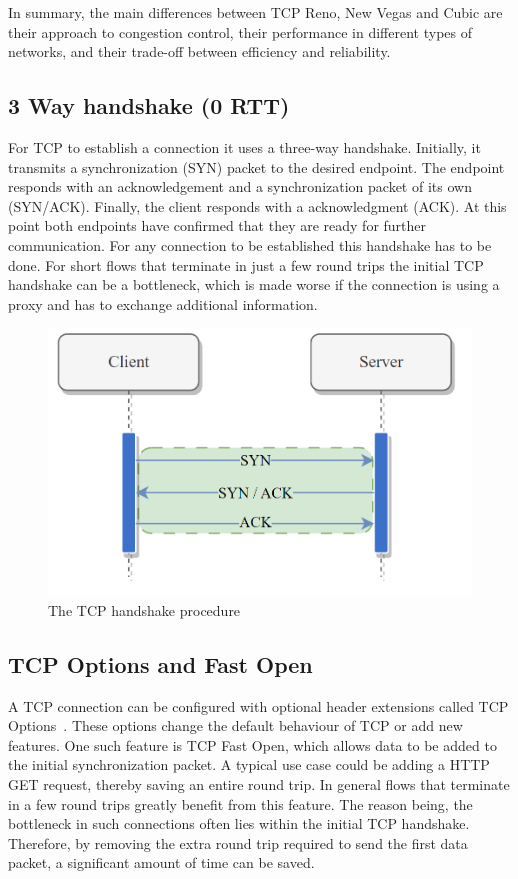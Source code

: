 \documentclass[a4paper,english, 11pt]{report}
\begin{document}
In summary, the main differences between TCP Reno, New Vegas and Cubic are their approach to congestion control, their performance in different types of networks, and their trade-off between efficiency and reliability.

\subsection{3 Way handshake (0 RTT)}
For TCP to establish a connection it uses a three-way handshake. Initially, it transmits a synchronization (SYN) packet to the desired endpoint. The endpoint responds with an acknowledgement and a synchronization packet of its own (SYN/ACK). Finally, the client responds with a acknowledgment (ACK). At this point both endpoints have confirmed that they are ready for further communication. For any connection to be established this handshake has to be done. For short flows that terminate in just a few round trips the initial TCP handshake can be a bottleneck, which is made worse if the connection is using a proxy and has to exchange additional information. 

\begin{figure} %
	\centering
	\includegraphics[scale=0.75]{../diagrams/drawio/tcphandshake.png}
  	\caption{The TCP handshake procedure}
  	\label{fig:tcphandshake}
\end{figure}

\subsection{TCP Options and Fast Open}
A TCP connection can be configured with optional header extensions called TCP Options~\cite{tcp_options}. These options change the default behaviour of TCP or add new features. One such feature is TCP Fast Open, which allows data to be added to the initial synchronization packet. A typical use case could be adding a HTTP GET request, thereby saving an entire round trip. In general flows that terminate in a few round trips greatly benefit from this feature. The reason being, the bottleneck in such connections often lies within the initial TCP handshake. Therefore, by removing the extra round trip required to send the first data packet, a significant amount of time can be saved.\\
\end{document}
